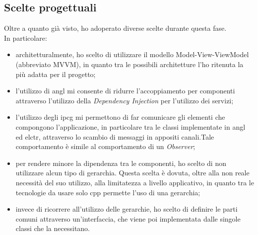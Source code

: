 \subsection{Scelte progettuali}
Oltre a quanto già visto, ho adoperato diverse scelte durante questa fase.\\
In particolare:
\begin{itemize}
    \item architetturalmente, ho scelto di utilizzare il modello Model-View-ViewModel (abbreviato MVVM), in quanto tra le possibili architetture l'ho ritenuta la più adatta per il progetto;
    \item l'utilizzo di \Gls{angl} mi consente di ridurre l'accoppiamento per componenti attraverso l'utilizzo della \emph{Dependency Injection} per l'utilizzo dei servizi;
    \item l'utilizzo degli \Gls{ipcg} mi permettono di far comunicare gli elementi che compongono l'applicazione, in particolare tra le classi implementate in \Gls{angl} ed \Gls{elctr}, attraverso lo scambio di messaggi in appositi canali.Tale comportamento è simile al comportamento di un \emph{Observer};
    \item per rendere minore la dipendenza tra le componenti, ho scelto di non utilizzare alcun tipo di gerarchia. Questa scelta è dovuta, oltre alla non reale necessità del suo utilizzo, alla limitatezza a livello applicativo, in quanto tra le tecnologie da usare solo \gls{cpp} permette l'uso di una gerarchia;
    \item invece di ricorrere all'utilizzo delle gerarchie, ho scelto di definire le parti comuni attraverso un'interfaccia, che viene poi implementata dalle singole classi che la necessitano.
\end{itemize}